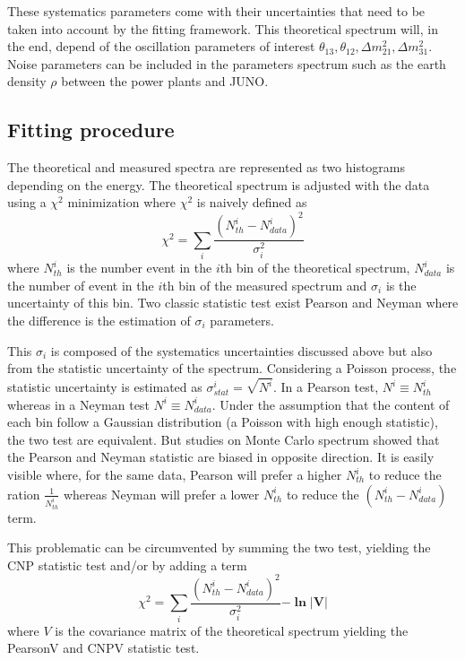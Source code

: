 \documentclass[../main.tex]{subfiles}
\begin{document}
These systematics parameters come with their uncertainties that need to be taken into account by the fitting framework. This theoretical spectrum will, in the end, depend of the oscillation parameters of interest $\theta_{13}, \theta_{12}, \Delta m^2_{21}, \Delta m^2_{31}$. Noise parameters can be included in the parameters spectrum such as the earth density $\rho$ between the power plants and JUNO.

\subsection{Fitting procedure}

The theoretical and measured spectra are represented as two histograms depending on the energy. The theoretical spectrum is adjusted with the data using a $\chi^2$ minimization where $\chi^2$ is naively defined as
\begin{equation}
  \chi^2 = \sum_i \frac{(N^i_{th} - N^i_{data})^2}{\sigma_i^2}
\end{equation}
where $N^i_{th}$ is the number event in the $i$th bin of the theoretical spectrum, $N^i_{data}$ is the number of event in the $i$th bin of the measured spectrum and $\sigma_i$ is the uncertainty of this bin. Two classic statistic test exist Pearson and Neyman where the difference is the estimation of $\sigma_i$ parameters.

This $\sigma_i$ is composed of the systematics uncertainties discussed above but also from the statistic uncertainty of the spectrum. Considering a Poisson process, the statistic uncertainty is estimated as $\sigma_{stat}^i = \sqrt{N^i}$. In a Pearson test, $N^i \equiv N^i_{th}$ whereas in a Neyman test $N^i \equiv N^i_{data}$. Under the assumption that the content of each bin follow a Gaussian distribution (a Poisson with high enough statistic), the two test are equivalent. But studies on Monte Carlo spectrum showed that the Pearson and Neyman statistic are biased in opposite direction. It is easily visible where, for the same data, Pearson will prefer a higher $N^i_{th}$ to reduce the ration $\frac{1}{N^i_{th}}$ whereas Neyman will prefer a lower $N^i_{th}$ to reduce the $(N^i_{th} - N^i_{data})$ term.

This problematic can be circumvented by summing the two test, yielding the CNP statistic test and/or by adding a term
\begin{equation}
  \chi^2 = \sum_i \frac{(N^i_{th} - N^i_{data})^2}{\sigma_i^2} \mathbf{- \ln |V|}
\end{equation}
where $V$ is the covariance matrix of the theoretical spectrum yielding the PearsonV and CNPV statistic test.
\end{document}
